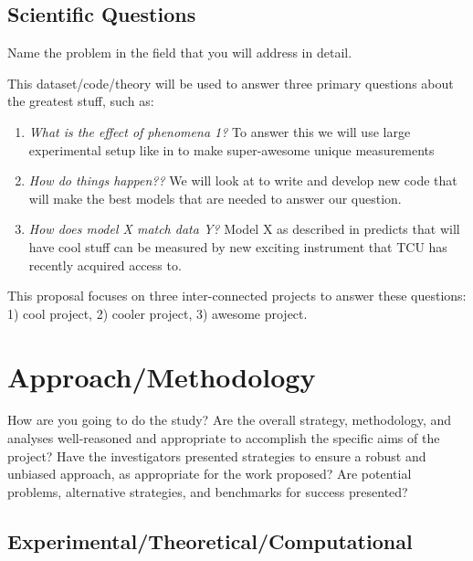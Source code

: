 \documentclass[11pt, preprint, flushrt]{aastex-numbers}
\begin{document}
\subsection{Scientific Questions}\vskip-0.05in

Name the problem in the field that you will address in detail.

\vskip0.1in
\noindent This dataset/code/theory will be used to answer three
primary questions about the greatest stuff, such as: 
\begin{enumerate}
\item {\em What is the effect of phenomena 1?}  To answer this we
  will use large experimental setup like in \citep{occam_p1} to make
  super-awesome unique measurements

\item\vskip -0.05in
 {\em How do things happen??}
We will look at \citep{binney98a} to write and develop new code that
will make the best models that are needed to answer our question.

\item \vskip -0.05in
{\em How does model X match data Y?}   
Model X as described in \citet{blandford96a} predicts that will 
have cool stuff can be measured by new exciting instrument that TCU
has recently acquired access to.

\end{enumerate}

This proposal focuses on three inter-connected projects to answer
these questions: 1) cool project, 2) cooler project, 3) awesome project.


\clearpage
\vspace{-0.2in}
\section{Approach/Methodology}\vskip-0.05in

How are you going to do the study?  Are the overall strategy,
methodology, and analyses well-reasoned and appropriate to accomplish
the specific aims of the project? Have the investigators presented
strategies to ensure a robust and unbiased approach, as appropriate
for the work proposed? Are potential problems, alternative
strategies, and benchmarks for success presented?

\subsection{Experimental/Theoretical/Computational}\vskip-0.05in
\end{document}
